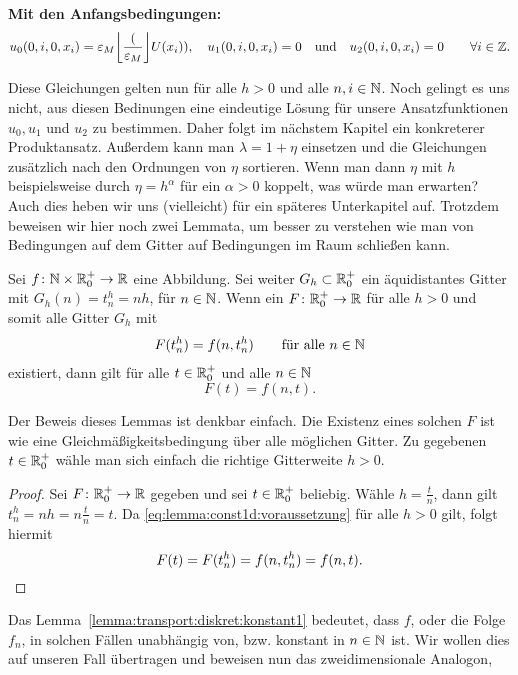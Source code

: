 \vspace{0.4cm}
\noindent \textbf{Mit den Anfangsbedingungen:}
\begin{align}\label{eq:transport:diskret:anfangsbedinungen}
u_0(0, i, 0, x_i) = \rd(U(x_i)), \quad u_1(0, i, 0, x_i) = 0 \quad \text{und} \quad u_2(0, i, 0, x_i) = 0 \qquad \forall i \in \Z.
\end{align}

Diese Gleichungen gelten nun für alle $h > 0$ und alle $n, i \in \mathbb N$.
Noch gelingt es uns nicht, aus diesen Bedinungen eine eindeutige Lösung für unsere Ansatzfunktionen $u_0, u_1$ und $u_2$ zu bestimmen.
Daher folgt im nächstem Kapitel ein konkreterer Produktansatz.
Außerdem kann man $\lambda = 1 + \eta$ einsetzen und die Gleichungen zusätzlich nach den Ordnungen von $\eta$ sortieren.
Wenn man dann $\eta$ mit $h$ beispielsweise durch $\eta = h^\alpha$ für ein $\alpha > 0$ koppelt, was würde man erwarten?
Auch dies heben wir uns (vielleicht) für ein späteres Unterkapitel auf.
Trotzdem beweisen wir hier noch zwei Lemmata, um besser zu verstehen wie man von Bedingungen auf dem Gitter auf Bedingungen im Raum schließen kann.

\begin{lemma} \label{lemma:transport:diskret:konstant1}
Sei $f\colon \mathbb N \times \mathbb R^+_0 \to \mathbb R$ eine Abbildung.
Sei weiter $G_h \subset \mathbb R^+_0$ ein äquidistantes Gitter mit $G_h(n) = t^h_n = n h$, für $n \in \mathbb N$.
Wenn ein $F\colon \mathbb R^+_0 \to \mathbb R$ für alle $h > 0$ und somit alle Gitter $G_h$ mit
\begin{align}\label{eq:lemma:const1d:voraussetzung}
F(t^h_n) = f(n, t^h_n) \qquad \text{für alle $n \in \mathbb N$}
\end{align}
existiert, dann gilt für alle $t \in \mathbb R^+_0$ und alle $n \in \mathbb N$
\[ F(t) = f(n, t). \]
\end{lemma}
Der Beweis dieses Lemmas ist denkbar einfach. Die Existenz eines solchen $F$ ist wie eine Gleichmäßigkeitsbedingung über alle möglichen Gitter.
Zu gegebenen $t \in \mathbb R^+_0$ wähle man sich einfach die richtige Gitterweite $h > 0$.
\begin{proof}
Sei $F\colon \mathbb R^+_0 \to \mathbb R$ gegeben und sei $t \in \mathbb R^+_0$ beliebig.
Wähle $h = \frac{t}{n}$, dann gilt $t^h_n = nh = n \frac{t}{n} = t$.
Da \eqref{eq:lemma:const1d:voraussetzung} für alle $h > 0$ gilt, folgt hiermit 
\[ F(t) = F(t^h_n) = f(n, t^h_n) = f(n, t). \qedhere \]
\end{proof}

Das Lemma~\ref{lemma:transport:diskret:konstant1} bedeutet, dass $f$, oder die Folge $f_n$, in solchen Fällen unabhängig von, bzw. konstant in $n \in \mathbb N$ ist.
Wir wollen dies auf unseren Fall übertragen und beweisen nun das zweidimensionale Analogon, 

